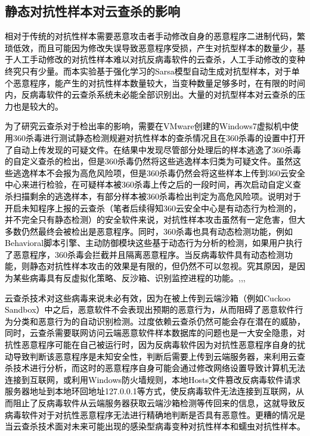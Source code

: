 \subsection{静态对抗性样本对云查杀的影响}

\textcolor{black}{相对于传统的对抗性样本需要恶意攻击者手动修改自身的恶意程序二进制代码，繁琐低效，而且可能因为修改失误导致恶意程序受损，产生对抗型样本的数量少，基于人工手动修改的对抗性样本难以对抗反病毒软件的云查杀，人工手动修改的变种终究只有少量。而本实验基于强化学习的Sarsa模型自动生成对抗型样本，对于单个恶意程序，能产生的对抗性样本数量较大，当变种数量足够多时，在有限的时间内，反病毒软件的云查杀系统未必能全部识别出。大量的对抗型样本对云查杀的压力也是较大的。}

\textcolor{black}{为了研究云查杀对于检出率的影响，需要在VMware创建的Windows7虚拟机中使用360杀毒进行测试静态检测规避对抗性样本的查杀情况且在360杀毒的设置中打开了自动上传发现的可疑文件。在结果中发现尽管部分处理后的样本逃逸了360杀毒的自定义查杀的检出，但是360杀毒仍然将这些逃逸样本归类为可疑文件。虽然这些逃逸样本不会报为高危风险项，但是360杀毒仍然会将这些样本上传到360云安全中心来进行检验，在可疑样本被360杀毒上传之后的一段时间，再次启动自定义查杀扫描剩余的逃逸样本，有部分样本被360杀毒检出判定为高危风险项。说明对于开启未知程序上报的云查杀（笔者后续得知360云安全中心是有动态行为检测的，并不完全只有静态检测）的安全软件来说，对抗性样本攻击虽然有一定危害，但大多数仍然最终会被检出是恶意程序。同时，360杀毒也具有动态检测功能，例如Behavioral脚本引擎、主动防御模块这些基于动态行为分析的检测，如果用户执行了恶意程序，360杀毒会拦截并且隔离恶意程序。当反病毒软件具有动态检测功能，则静态对抗性样本攻击的效果是有限的，但仍然不可以忽视。究其原因，是因为某些病毒具有反虚拟化策略、反沙箱、识别监控进程的功能。\parencite{ref33},\parencite{ref34},\parencite{ref35},\parencite{ref36}}

\textcolor{black}{云查杀技术对这些病毒来说未必有效，因为在被上传到云端沙箱（例如Cuckoo Sandbox）中之后，恶意软件不会表现出预期的恶意行为，从而阻碍了恶意软件行为分类和恶意行为的自动识别检测。过度依赖云查杀仍然可能会存在潜在的威胁，同时，云查杀需要联网访问云端恶意软件样本数据库的问题也是一大安全隐患，对抗性恶意程序可能在自己被运行时，因为反病毒软件因为对抗性恶意程序自身的扰动导致判断该恶意程序是未知安全性，判断后需要上传到云端服务器，来利用云查杀技术进行分析，而这时的恶意程序自身可能会通过修改网络设置导致计算机无法连接到互联网，或利用Windows防火墙规则，本地Hosts文件篡改反病毒软件请求服务器地址到本地环回地址127.0.0.1等方式，使反病毒软件无法连接到互联网，从而阻止了反病毒软件从云端服务器获取云端沙箱检测等传回来的信息，这就导致反病毒软件对于对抗性恶意程序无法进行精确地判断是否具有恶意性。更糟的情况是当云查杀技术面对未来可能出现的感染型病毒变种对抗性样本和蠕虫对抗性样本。}

